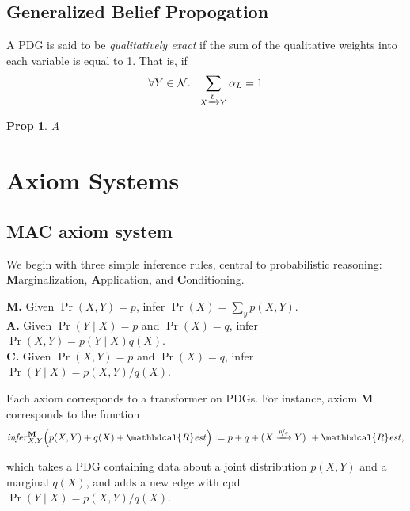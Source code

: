 \documentclass{article}
\theoremstyle{plain}
\newtheorem{prop}[theorem]{Prop}
\theoremstyle{definition}
\theoremstyle{remark}
\newcommand{\N}{\mathcal N}
\newcommand{\dg}[1]{\mathbdcal{#1}}
\newcommand{\bundle}{\mathbin{+}}
\newcommand{\ed}[3]{%
		\mathchoice%
		{#2\overset{\smash{\mskip-5mu\raisebox{-3pt}{${#1}$}}}{\xrightarrow{\hphantom{\scriptstyle {#1}}}} #3} %
		{#2\overset{\smash{\mskip-5mu\raisebox{-3pt}{$\scriptstyle {#1}$}}}{\xrightarrow{\hphantom{\scriptstyle {#1}}}} #3}%
		{#2\overset{\smash{\mskip-5mu\raisebox{-3pt}{$\scriptscriptstyle {#1}$}}}{\xrightarrow{\hphantom{\scriptscriptstyle {#1}}}} #3} %
		{#2\overset{\smash{\mskip-5mu\raisebox{-3pt}{$\scriptscriptstyle {#1}$}}}{\xrightarrow{\hphantom{\scriptscriptstyle {#1}}}} #3}} %
\newcommand{\alle}[1][L]{_{\ed {#1}XY}}
\begin{document}
\subsection{Generalized Belief Propogation}

\begin{defn}
	A PDG is said to be \emph{qualitatively exact} if the sum of the qualitative weights into each variable is equal to 1.
	That is, if
	\[ \forall Y \in \N.~~ \sum\alle \alpha_{L} = 1  \]
\end{defn}

\begin{prop}
	A
\end{prop}

\section{Axiom Systems}

\subsection{MAC axiom system}
We begin with three simple inference rules, central to probabilistic reasoning: \textbf Marginalization, \textbf Application, and \textbf Conditioning.

\textbf{M.} Given $\Pr(X,Y) = p$, infer $\Pr(X) = \sum_y p(X,Y)$. \\
\textbf{A.} Given $\Pr(Y \mid X) = p$ and $\Pr(X) = q$, infer $\Pr(X, Y) = p(Y \mid X) q(X)$. \\
\textbf{C.} Given $\Pr(X,Y) = p$ and $\Pr(X) = q$, infer $\Pr(Y \mid X) = p(X,Y) / q(X)$.

Each axiom corresponds to a transformer on PDGs. For instance, axiom \textbf{M} corresponds to the function
\begin{align*}
	\mathit{infer}^{\textbf{M}}_{X,Y} \Big(p(X,Y) \bundle q(X) \bundle \dg R\mathit{est} \Big)
	:=
	p \bundle q \bundle  (X \xrightarrow{\nicefrac pq} Y)~\bundle \dg R\mathit{est}, \\
\end{align*}
	
which takes a PDG containing data about a joint distribution $p(X,Y)$ and a marginal $q(X)$, and adds a new edge with cpd $\Pr(Y \mid X) = p(X,Y)/ q(X)$.
\end{document}
